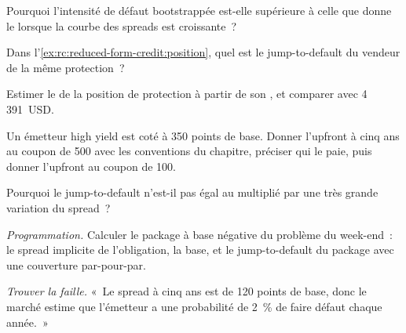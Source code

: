 \begin{exercise}[$\star$]\label{exo:rc:reduced-form-credit:2}
Pourquoi l'intensité de défaut bootstrappée est-elle supérieure à celle que donne le 
lorsque la courbe des spreads est croissante~?
\end{exercise}

\begin{exercise}[$\star$]\label{exo:rc:reduced-form-credit:3}
Dans l'\cref{ex:rc:reduced-form-credit:position}, quel est le jump-to-default
du vendeur de la même protection~?
\end{exercise}

\begin{exercise}[$\star\star$]\label{exo:rc:reduced-form-credit:4}
Estimer le  de la position de protection à partir de son , et comparer avec
4\,391~USD.
\end{exercise}

\begin{exercise}[$\star\star$]\label{exo:rc:reduced-form-credit:5}
Un émetteur high yield est coté à 350 points de base. Donner l'upfront à cinq ans au coupon de 500
avec les conventions du chapitre, préciser qui le paie, puis donner l'upfront au
coupon de 100.
\end{exercise}

\begin{exercise}[$\star\star$]\label{exo:rc:reduced-form-credit:6}
Pourquoi le jump-to-default n'est-il pas égal au  multiplié par une très grande variation du spread~?
\end{exercise}

\begin{exercise}[$\star\star\star$]\label{exo:rc:reduced-form-credit:7}
\emph{Programmation.} Calculer le package à base négative du problème du week-end~: le
spread implicite de l'obligation, la base, et le jump-to-default du package avec une
couverture par-pour-par.
\end{exercise}

\begin{exercise}[$\star\star\star$]\label{exo:rc:reduced-form-credit:8}
\emph{Trouver la faille.} «~Le spread à cinq ans est de 120 points de base, donc le marché
estime que l'émetteur a une probabilité de 2~\% de faire défaut chaque année.~»
\end{exercise}

